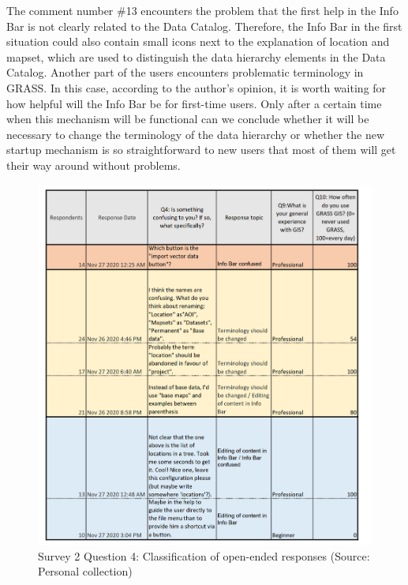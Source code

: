 \documentclass[a4paper,10pt,twoside]{article}
\begin{document}
\noindent The comment number \#13 encounters the problem that the
first help in the Info Bar is not clearly related to the Data
Catalog. Therefore, the Info Bar in the first situation could also
contain small icons next to the explanation of location and mapset,
which are used to distinguish the data hierarchy elements in the Data
Catalog. Another part of the users encounters problematic terminology
in GRASS. In this case, according to the author's opinion, it is worth
waiting for how helpful will the Info Bar be for first-time
users. Only after a certain time when this mechanism will be
functional can we conclude whether it will be necessary to change the
terminology of the data hierarchy or whether the new startup mechanism
is so straightforward to new users that most of them will get their
way around without problems.

\vspace{0.3cm}
\begin{figure}[hbt!] 
\begin{center}
\includegraphics[width=16.5cm]{../surveys/analyzed_data/survey2_question4.png} 
\caption[Survey 2 Question 4: Classification of open-ended responses]{Survey 2 Question 4: Classification of open-ended responses (Source: Personal collection)}
\label{fig:survey2_question4}
\end{center}
\end{figure}
\end{document}
